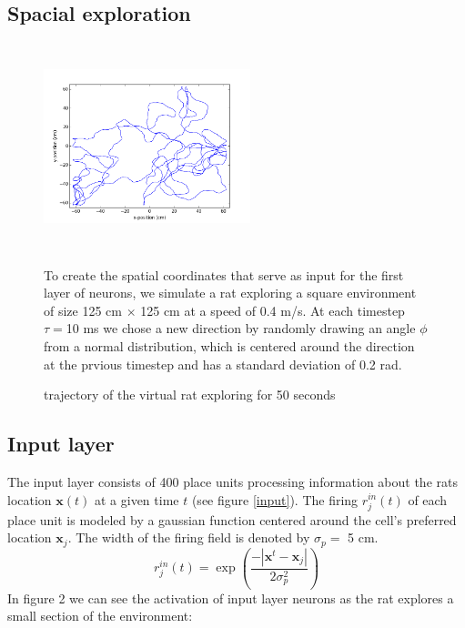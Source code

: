 \documentclass[a4paper, 12pt]{article}
\begin{document}
\subsection{Spacial exploration}
\begin{figure}[h]
\begin{minipage}{0.4\textwidth}
	\includegraphics[width=6cm, height=6cm]{pics/running_rat.png}
	\caption{\footnotesize{trajectory of the virtual rat exploring for 50 seconds}}
\end{minipage}
\begin{minipage}{0.6\textwidth}
To create the spatial coordinates that serve as input for the first layer of neurons, we simulate a rat exploring a square environment of size 125 cm $\times$ 125 cm at a speed of 0.4 m/s. At each timestep $\tau=$10 ms we chose a new direction by randomly drawing an angle $\phi$ from a normal distribution, which is centered around the direction at the prvious timestep and has a standard deviation of 0.2 rad.   
\end{minipage}
\end{figure}


\subsection{Input layer}
The input layer consists of 400 place units processing information about the rats location $\boldsymbol{x}(t)$ at a given time $t$ (see figure \ref{input}). The firing $r_j^{in}(t)$ of each place unit is modeled by a gaussian function centered around the cell's preferred location $\boldsymbol{x}_j$. The width of the firing field is denoted by $\sigma_p=$ 5 cm. 
	\begin{equation}
	r_j^{in}(t)=\exp\left(\frac{-|\boldsymbol{x}^t-\boldsymbol{x}_j|}{2\sigma_p^2}\right)
	\end{equation}
In figure 2 we can see the activation of input layer neurons as the rat explores a small section of the environment:  
\end{document}

